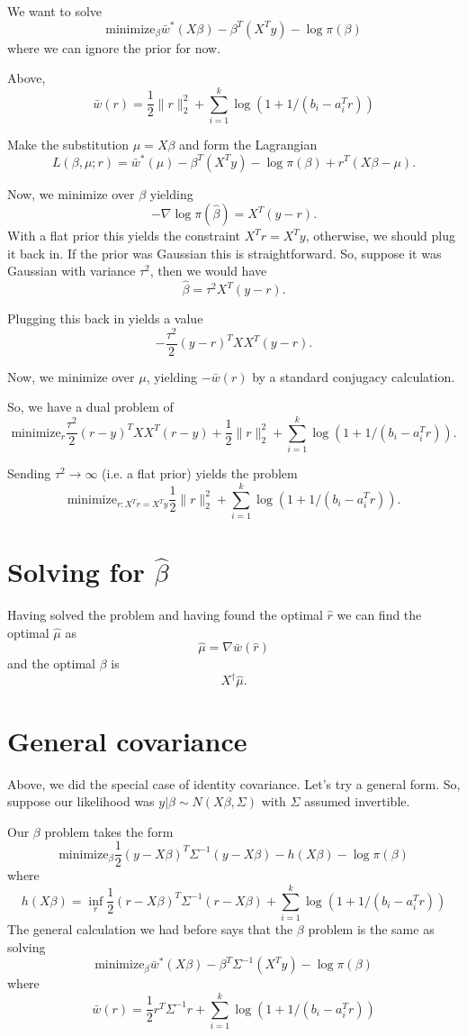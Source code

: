 \documentclass{article}
\begin{document}
We want to solve
$$
\text{minimize}_{\beta} \bar{w}^*(X\beta) - \beta^T(X^Ty) - \log \pi (\beta)
$$
where we can ignore the prior for now.

Above, 
$$
\bar{w}(r) = \frac{1}{2} \|r\|^2_2 + \sum_{i=1}^k \log(1 + 1 /(b_i - a_i^Tr))
$$

Make the substitution $\mu=X\beta$ and form the Lagrangian
$$
L(\beta,\mu;r) = \bar{w}^*(\mu) - \beta^T(X^Ty) - \log \pi (\beta) + r^T(X\beta-\mu).
$$

Now, we minimize over $\beta$ yielding
$$
- \nabla \log \pi(\hat{\beta}) = X^T(y-r).
$$
With a flat prior this yields the constraint $X^Tr=X^Ty$, otherwise, we should plug it back in. If the prior was Gaussian this is straightforward. So, suppose it was Gaussian with variance
$\tau^2$, then we would have
$$
\hat{\beta} = \tau^2 X^T(y-r).
$$

Plugging this back in yields a value
$$
-\frac{\tau^2}{2}(y-r)^TXX^T(y-r).
$$

Now, we minimize over $\mu$, yielding
$-\bar{w}(r)$ by a standard conjugacy calculation.

So, we have a dual problem of
$$
\text{minimize}_r \frac{\tau^2}{2}(r-y)^TXX^T(r-y) + \frac{1}{2} \|r\|^2_2 + \sum_{i=1}^k \log(1 + 1 /(b_i - a_i^Tr)).
$$

Sending $\tau^2 \to \infty$ (i.e. a flat prior) yields the problem
$$
\text{minimize}_{r:X^Tr=X^Ty} \frac{1}{2} \|r\|^2_2 + \sum_{i=1}^k \log(1 + 1 /(b_i - a_i^Tr)).
$$

\section{Solving for $\hat{\beta}$}

Having solved the problem and having found the optimal $\hat{r}$ we can find the optimal
$\hat{\mu}$ as
$$
\hat{\mu} = \nabla \bar{w}(\hat{r})
$$
and the optimal $\beta$ is 
$$
X^{\dagger}\hat{\mu}.
$$

\section{General covariance}

Above, we did the special case of identity covariance. Let's try a general form.
So, suppose our likelihood was $y|\beta \sim N(X\beta, \Sigma)$ with
$\Sigma$ assumed invertible.  

Our $\beta$ problem takes the form
$$
\text{minimize}_{\beta} \frac{1}{2}(y-X\beta)^T\Sigma^{-1}(y-X\beta) - h(X\beta) - \log \pi(\beta)
$$
where
$$
h(X\beta) = \inf_{r} \frac{1}{2}(r-X\beta)^T\Sigma^{-1}(r-X\beta) +  \sum_{i=1}^k \log(1 + 1 /(b_i - a_i^Tr)) 
$$
The general calculation we had before says that the $\beta$ problem is the same as solving
$$
\text{minimize}_{\beta} \bar{w}^*(X\beta) - \beta^T\Sigma^{-1}(X^Ty) - \log \pi (\beta)
$$
where
$$
\bar{w}(r) = \frac{1}{2}r^T\Sigma^{-1}r + \sum_{i=1}^k \log(1 + 1 /(b_i - a_i^Tr)) 
$$
\end{document}
